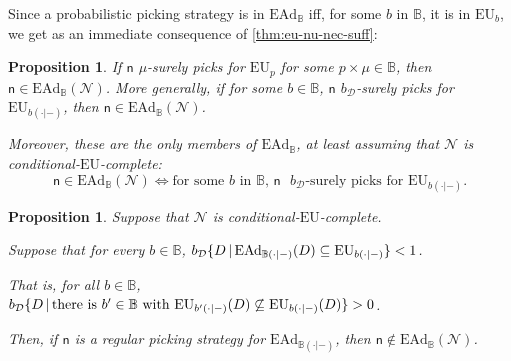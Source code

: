 \documentclass[a4paper]{article}
\newtheorem{proposition}[theorem]{Proposition}
\renewcommand\P{\mathbb{P}} %
\newcommand\EU{\mathrm{EU}}
\newcommand\EAd{\mathrm{EAd}}
\newcommand{\D}{\mathcal{D}}
\newcommand{\Decs}{\mathcal{D}}
\renewcommand\c{\mathsf{c}} %
\newcommand{\n}{\mathsf{n}}
\newcommand\Nu{\mathcal{N}}
\newcommand{\IB}{\mathbb{B}}
\newcommand{\IP}{\P}
\newcommand{\todoold}[2][]{\todo[backgroundcolor=white,bordercolor=orange!10,linecolor=gray!10, #1,caption={},textcolor=gray]{Pre-rev: #2}}
\newcommand{\todooldinfo}[2][]{\todoold[#1]{#2}}
\newcommand\SetDelimiter[1][]{
	\nonscript\,#1\vert \allowbreak \nonscript\,\mathopen{}}
\providecommand\given{\SetDelimiter}
\newenvironment{CCM rewritten}
{\begingroup\color{blue}} %
{\endgroup}              %
\begin{document}
Since a probabilistic picking strategy is in $\EAd_\IB$ iff, for some $b$ in $\IB$, it is in $\EU_b$, we get as an immediate consequence of \cref{thm:eu-nu-nec-suff}:
\begin{proposition}\label{thm:ead-nu-nec-suff}
If $\n$ $\mu$-surely picks for $\EU_p$ for some $p\times \mu\in \IB$, then $\n\in\EAd_\IB(\Nu)$. More generally, if for some $b\in\IB$, $\n$ $b_\Decs$-surely picks for $\EU_{b(\cdot|-)}$, then $\n\in\EAd_\IB(\Nu)$. 

Moreover, these are the only members of $\EAd_\IB$, at least assuming that $\Nu$ is conditional-$\EU$-complete: 
$$\n \in \EAd_\IB(\Nu) \Leftrightarrow \text{for some $b$ in $\IB$, $\n$ $b_\Decs$-surely picks for $\EU_{b(\cdot|-)}$.}$$

\end{proposition}


	\begin{proposition}\label{thm:ead-nu-reg-nec}
		Suppose that $\Nu$ is conditional-$\EU$-complete.
		
Suppose that for every $b\in\IB$, $b_\D\{D\given \EAd_{\IB(\cdot|-)}(D)\subseteq\EU_{b(\cdot|-)}\}<1$. 

That is, for all $b\in \IB$, $b_\D\{D\given \text{there is $b'\in\IB$ with }\EU_{b'(\cdot|-)}(D)\not\subseteq\EU_{b(\cdot|-)}(D)\}>0$. 
		
		
	Then, if $\n$ is a regular picking strategy for $\EAd_{\IB(\cdot|-)}$, then $\n\notin \EAd_\IB(\Nu)$.
	\end{proposition}
	
\end{document}
